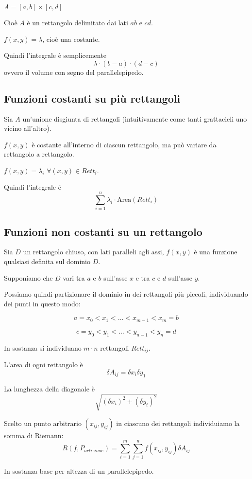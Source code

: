 $A= [a,b] \times [c,d]$

Cioè $A$ è un rettangolo delimitato dai lati $ab$ e $cd$.

$f(x,y) = \lambda$, cioè una costante.

Quindi l'integrale è semplicemente $$\lambda \cdot (b-a) \cdot (d-c)$$ ovvero il volume con segno del parallelepipedo.

\subsection{Funzioni costanti su più rettangoli}

Sia $A$ un'unione disgiunta di rettangoli (intuitivamente come tanti grattacieli uno vicino all'altro).

$f(x,y)$ è costante all'interno di ciascun rettangolo, ma può variare da rettangolo a rettangolo.

$f(x,y) = \lambda_i$ $\forall (x,y) \in Rett_i$.

Quindi l'integrale é $$\sum_{i=1}^{n} \lambda_i \cdot \text{Area}(Rett_i)$$

\subsection{Funzioni non costanti su un rettangolo}

Sia $D$ un rettangolo chiuso, con lati paralleli agli assi, $f(x,y)$ è una funzione qualsiasi definita sul dominio $D$.

Supponiamo che $D$ vari tra $a$ e $b$ sull'asse $x$ e tra $c$ e $d$ sull'asse $y$.

Possiamo quindi partizionare il dominio in dei rettangoli più piccoli, individuando dei punti in questo modo:

$$a = x_0 < x_1 < \ldots < x_{m-1} < x_m = b$$


$$c = y_0 < y_1 < \ldots < y_{n-1} < y_n = d$$

In sostanza si individuano $m \cdot n$ rettangoli $Rett_{ij}$.

L'area di ogni rettangolo è $$\delta A_{ij} = \delta x_i \delta y_1$$

La lunghezza della diagonale è
$$\sqrt{(\delta x_i)^2+(\delta y_i)^2}$$

Scelto un punto arbitrario $(x_{ij},y_{ij})$ in ciascuno dei rettangoli individuiamo la somma di Riemann:
$$R(f,P_{artizione}) = \sum^m_{i=1} \sum^n_{j=1} f(x_{ij},y_{ij}) \delta A_{ij}$$

In sostanza base per altezza di un parallelepipedo.

